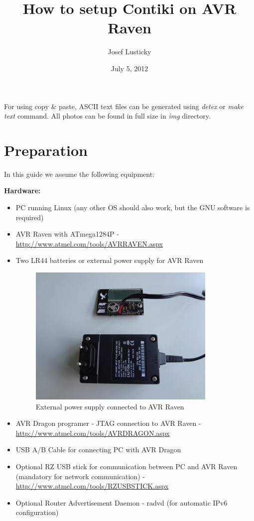\documentclass{article}
\begin{document}
\title{How to setup Contiki on AVR Raven}
\author{Josef Lusticky}
\date{July 5, 2012}

\maketitle

For using copy \& paste, ASCII text files can be generated
using {\it{detex}} or {\it{make text}} command.
All photos can be found in full size in {\it{img}} directory.

\section{Preparation}
In this guide we assume the following equipment:

\vspace{0.2cm}

{\textbf{Hardware:}}
\begin{itemize}
	\item PC running Linux (any other OS should also work, but the GNU software is required)
	\item AVR Raven with ATmega1284P - \url{http://www.atmel.com/tools/AVRRAVEN.aspx}
	\item Two LR44 batteries or external power supply for AVR Raven
\begin{figure}[H]
  \centering
  \includegraphics[width=9cm,keepaspectratio]{smallfig/DSC02594-small.jpeg}
  \caption{External power supply connected to AVR Raven}
\end{figure}
	\item AVR Dragon programer - JTAG connection to AVR Raven - \url{http://www.atmel.com/tools/AVRDRAGON.aspx}
	\item USB A/B Cable for connecting PC with AVR Dragon
	\item Optional RZ USB stick for communication between PC and AVR Raven
	(mandatory for network communication) - \url{http://www.atmel.com/tools/RZUSBSTICK.aspx}
	\item Optional Router Advertisement Daemon - radvd (for automatic IPv6 configuration)
\end{itemize}
\end{document}
